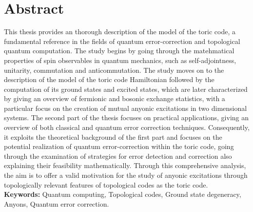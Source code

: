 \documentclass{Configuration_Files/PoliMi3i_thesis}
\begin{document}


\pagestyle{empty} %
\frontmatter %


\startpreamble
\setcounter{page}{1} %

\chapter*{Abstract} 
This thesis provides an thorough description of the model of the toric code, a fundamental 
reference in the fields of quantum error-correction and topological quantum computation. The study begins by going through the matehmatical properties of spin observables in quantum mechanics, such as self-adjointness, unitarity, commutation and anticommutation. The study moves on to the description of the model of the toric code Hamiltonian followed by the computation of its ground states and excited states, which are later characterized by giving an overview of fermionic and bosonic exchange statistics, with a particular focus on the creation of mutual anyonic excitations in two dimensional systems. The second part of the thesis focuses on practical applications, giving an overview of both classical and quantum error correction techniques. Consequently, it exploits the theoretical background of the first part and focuses on the potential realization of quantum error-correction 
within the toric code, going through the examination of strategies for error detection and correction also explaining their feasibility mathematically. Through this comprehensive analysis, the aim is to offer a valid motivation for
the study of anyonic excitations through topologically relevant features of topological
codes as the toric code. \newline
\\
\textbf{Keywords:} Quantum computing, Topological codes, Ground state degeneracy, Anyons, Quantum error correction. %
\end{document}
